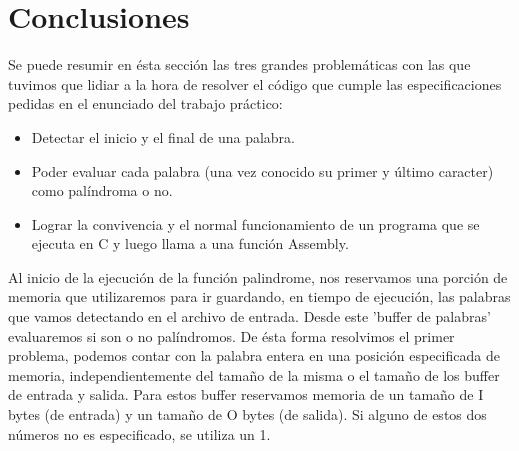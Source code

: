 \documentclass[a4paper,10pt]{article}
\begin{document}
\section{Conclusiones}






Se puede resumir en ésta sección las tres grandes problemáticas con las que tuvimos que lidiar a la hora de resolver el código que cumple las especificaciones pedidas en el enunciado del trabajo práctico:

\begin{itemize}
\item Detectar el inicio y el final de una palabra.

\item Poder evaluar cada palabra (una vez conocido su primer y último caracter) como palíndroma o no.

\item Lograr la convivencia y el normal funcionamiento de un programa que se ejecuta en C y luego llama a una función Assembly.
\end{itemize}

	Al inicio de la ejecución de la función palindrome, nos reservamos una porción de memoria que utilizaremos para ir guardando, en tiempo de ejecución, las palabras que vamos detectando en el archivo de entrada. Desde este 'buffer de palabras' evaluaremos si son o no palíndromos. De ésta forma resolvimos el primer problema, podemos contar con la palabra entera en una posición especificada de memoria, independientemente del tamaño de la misma o el tamaño de los buffer de entrada y salida. Para estos buffer reservamos memoria de un tamaño de I bytes (de entrada) y un tamaño de O bytes (de salida). Si alguno de estos dos números no es especificado, se utiliza un 1.
	
\end{document}
